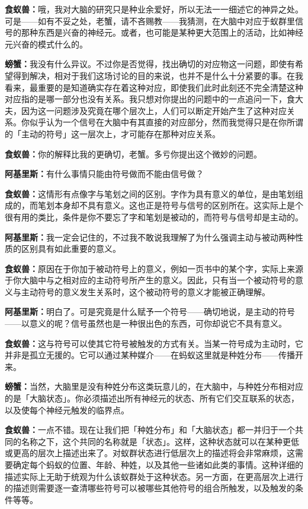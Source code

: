 \documentclass[
  12pt,
  twoside,
  openright,
  oldfontcommands,
]{memoir}
\newcommand{\dialogname}[1]{{\heifamily\bfseries #1}}
\begin{document}
\dialogname{食蚁兽：}哦，我对大脑的研究只是种业余爱好，所以无法一一细述它的神异之处。可是------如有不妥之处，老蟹，请不吝赐教------我猜测，在大脑中对应于蚁群里信号的那种东西是兴奋的神经元。或者，也可能是某种更大范围上的活动，比如神经元兴奋的模式什么的。

\dialogname{螃蟹：}我没有什么异议。不过你是否觉得，找出确切的对应物这一问题，即使有希望得到解决，相对于我们这场讨论的目的来说，也并不是什么十分紧要的事。在我看来，最重要的是知道确实存在着这种对应，即使我们此时此刻还不完全清楚这种对应指的是哪一部分也没有关系。我只想对你提出的问题中的一点追问一下，食大夫，因为这一问题涉及究竟在哪个层次上，人们可以断定开始产生了这种对应关系。你似乎认为一个信号在大脑中有其直接的对应部分，然而我觉得只是在你所谓的「主动的符号」这一层次上，才可能存在那种对应关系。

\dialogname{食蚁兽：}你的解释比我的更确切，老蟹。多亏你提出这个微妙的问题。

\dialogname{阿基里斯：}有什么事情只能由符号做而不能由信号做？

\dialogname{食蚁兽：}这情形有点像字与笔划之间的区别。字作为具有意义的单位，是由笔划组成的，而笔划本身却不具有意义。这也正是符号与信号的区别所在。这实际上是个很有用的类比，条件是你不要忘了字和笔划是被动的，而符号与信号却是主动的。

\dialogname{阿基里斯：}我一定会记住的，不过我不敢说我理解了为什么强调主动与被动两种性质的区别具有如此重要的意义。

\dialogname{食蚁兽：}原因在于你加于被动符号上的意义，例如一页书中的某个字，实际上来源于你大脑中与之相对应的主动符号所产生的意义。因此，只有当一个被动符号的意义与主动符号的意义发生关系时，这个被动符号的意义才能被正确理解。

\dialogname{阿基里斯：}明白了。可是究竟是什么赋予一个符号------确切地说，是主动的符号------以意义的呢？信号虽然也是一种很出色的东西，可你却说它不具有意义。

\dialogname{食蚁兽：}这与符号可以使其它符号被触发的方式有关。当某一符号成为主动时，它并非是孤立无援的。它可以通过某种媒介------在蚂蚁这里就是种姓分布------传播开来。

\dialogname{螃蟹：}当然，大脑里是没有种姓分布这类玩意儿的，在大脑中，与种姓分布相对应的是「大脑状态」。你必须描述出所有神经元的状态、所有它们交互联系的状态，以及使每个神经元触发的临界点。

\dialogname{食蚁兽：}一点不错。现在让我们把「种姓分布」和「大脑状态」都一并归于一个共同的名称之下，这个共同的名称就是「状态」。这样，这种状态就可以在某种更低或更高的层次上描述出来了。对蚁群状态进行低层次上的描述将会非常麻烦，这需要确定每个蚂蚁的位置、年龄、种姓，以及其他一些诸如此类的事情。这种详细的描述实际上无助于统观为什么该蚁群处于这种状态。另一方面，在更高层次上进行的描述则需要逐一查清哪些符号可以被哪些其他符号的组合所触发，以及触发的条件等等。
\end{document}
